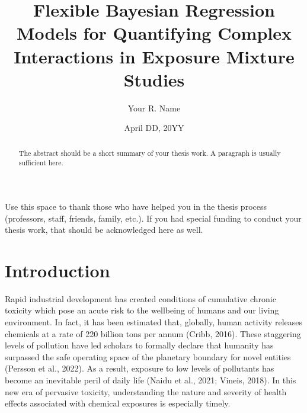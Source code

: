 \documentclass[12pt, twoside]{amherstthesis}
\title{Flexible Bayesian Regression Models for Quantifying Complex Interactions in Exposure Mixture Studies}
\author{Your R. Name}
\date{April DD, 20YY}
\begin{document}
\doublespace
  \maketitle

\frontmatter %
\pagestyle{fancyplain}

  \begin{abstract}
    The abstract should be a short summary of your thesis work. A paragraph is usually sufficient here.
  \end{abstract}
  \begin{acknowledgments}
    Use this space to thank those who have helped you in the thesis process (professors, staff, friends, family, etc.). If you had special funding to conduct your thesis work, that should be acknowledged here as well.
  \end{acknowledgments}

  \hypersetup{linkcolor=black}
  \setcounter{tocdepth}{2}
  \tableofcontents

  \listoftables

  \listoffigures


\mainmatter %
\pagestyle{fancyplain} %

\hypertarget{intro}{%
\chapter{Introduction}\label{intro}}

Rapid industrial development has created conditions of cumulative chronic toxicity which pose an acute risk to the wellbeing of humans and our living environment. In fact, it has been estimated that, globally, human activity releases chemicals at a rate of 220 billion tons per annum (Cribb, 2016). These staggering levels of pollution have led scholars to formally declare that humanity has surpassed the safe operating space of the planetary boundary for novel entities (Persson et al., 2022). As a result, exposure to low levels of pollutants has become an inevitable peril of daily life (Naidu et al., 2021; Vineis, 2018). In this new era of pervasive toxicity, understanding the nature and severity of health effects associated with chemical exposures is especially timely.
\end{document}
